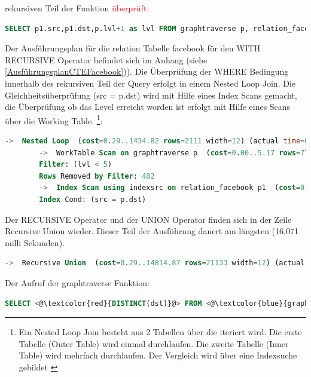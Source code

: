 rekursiven Teil der Funktion \textcolor{red}{überprüft}:
\begin{lstlisting}[language=SQL,caption = Überprüfen der Abbruchbedingung,frame=single, label={Abbruchbedingung} ]
    SELECT p1.src,p1.dst,p.lvl+1 as lvl FROM graphtraverse p, relation_facebook p1 WHERE p1.src IN ( p.dst ) and <@\textcolor{red}{lvl<5} @>
\end{lstlisting}
Der Ausführungsplan für die relation Tabelle facebook für den WITH RECURSIVE Operator befindet sich im Anhang (siehe \ref{AusführungsplanCTEFacebook})).
Die Überprüfung der WHERE Bedingung innerhalb des rekursiven Teil der Query erfolgt in einem Nested Loop Join. Die Gleichheitsüberprüfung (src = p.dst) wird mit Hilfe
eines Index Scans gemacht, die Überprüfung ob das Level erreicht worden ist erfolgt mit Hilfe eines Scans über die Working Table.
\footnote{Ein Nested Loop Join besteht aus 2 Tabellen über die iteriert wird. Die erste Tabelle (Outer Table) wird einmal durchlaufen. Die zweite
Tabelle (Inner Table) wird mehrfach durchlaufen. Der Vergleich wird über eine Indexsuche gebildet \cite[Seite 213]{froehlich01}}:
\newpage
\begin{lstlisting}[language=SQL,caption = Überprüfung der WHERE Bedingung,frame=single, label={WhereConditionCTE} ]
    ->  Nested Loop  (cost=0.29..1434.82 rows=2111 width=12) (actual time=0.018..2.174 rows=8173 loops=5)
        ->  WorkTable Scan on graphtraverse p  (cost=0.00..5.17 rows=77 width=8) (actual time=0.016..0.065 rows=729 loops=5)
        Filter: (lvl < 5)
        Rows Removed by Filter: 482
        ->  Index Scan using indexsrc on relation_facebook p1  (cost=0.29..18.23 rows=27 width=8) (actual time=0.001..0.002 rows=11 loops=3645)
        Index Cond: (src = p.dst)
\end{lstlisting}
Der RECURSIVE Operator und der UNION Operator finden sich in der Zeile Recursive Union wieder. Dieser Teil der Ausführung dauert am längsten (16,071 milli Sekunden).
\begin{lstlisting}[language=SQL,caption = Überprüfung der WHERE Bedingung,frame=single, label={WhereConditionCTE} ]
    ->  Recursive Union  (cost=0.29..14814.87 rows=21133 width=12) (actual time=0.014..16.085 rows=6056 loops=1)
\end{lstlisting}
Der Aufruf der graphtraverse Funktion:
\begin{lstlisting}[language=SQL,caption = Aufruf der graphtraverse Funktion,frame=single, label={WhereConditionCTE} ]
    SELECT <@\textcolor{red}{DISTINCT(dst)}@> FROM <@\textcolor{blue}{graphtraverse}@> order by dst
\end{lstlisting}

